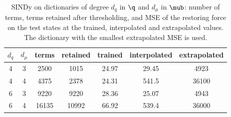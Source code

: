 \begin{table}[htbp]
  \centering
  \caption{SINDy on dictionaries of degree $d_{q}$ in $\q$ and $d_{\mu}$ in $\mub$: number of
    terms, terms retained after thresholding, and MSE of the restoring force on the test states at the trained,
    interpolated and extrapolated values. The dictionary with the smallest extrapolated MSE is used.}
  \label{tab:beam-sindy}
  \footnotesize\setlength{\tabcolsep}{4pt}
  \begin{tabular}{ccccccc}
    \toprule
    $d_{q}$ & $d_{\mu}$ & terms & retained & trained & interpolated & extrapolated \\
    \midrule
    4 & 3 & 2500 & 1015 & \num{24.97} & \num{29.45} & \num{4923} \\
    4 & 4 & 4375 & 2378 & \num{24.31} & \num{541.5} & \num{36100} \\
    6 & 3 & 9220 & 9220 & \num{28.36} & \num{25.07} & \num{4943} \\
    6 & 4 & 16135 & 10992 & \num{66.92} & \num{539.4} & \num{36000} \\
    \bottomrule
  \end{tabular}
\end{table}
